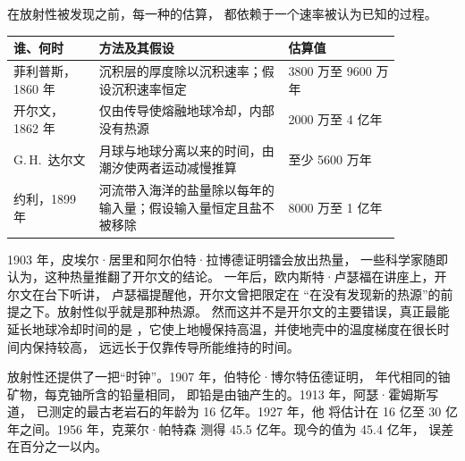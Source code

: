 在放射性被发现之前，每一种的估算，
都依赖于一个速率被认为已知的过程。

\begin{center}
\small
\begin{tabular}{|p{0.19\linewidth}|p{0.42\linewidth}|p{0.25\linewidth}|}
\hline
谁、何时 & 方法及其假设 & 估算值 \\
\hline
菲利普斯，1860 年 & 沉积层的厚度除以沉积速率；假设沉积速率恒定 & 3800 万至 9600 万年 \\
开尔文，1862 年 & 仅由传导使熔融地球冷却，内部没有热源 & 2000 万至 4 亿年 \\
G.\,H.~达尔文 & 月球与地球分离以来的时间，由潮汐使两者运动减慢推算 & 至少 5600 万年 \\
约利，1899 年 & 河流带入海洋的盐量除以每年的输入量；假设输入量恒定且盐不被移除 & 8000 万至 1 亿年 \\
\hline
\end{tabular}
\end{center}

\begin{history}[开尔文缺失的热量]
1903 年，皮埃尔·居里和阿尔伯特·拉博德证明镭会放出热量，
一些科学家随即认为，这种热量推翻了开尔文的结论。
一年后，欧内斯特·卢瑟福在讲座上，开尔文在台下听讲，
卢瑟福提醒他，开尔文曾把限定在
“在没有发现新的热源”的前提之下。放射性似乎就是那种热源。
然而这并不是开尔文的主要错误，真正最能延长地球冷却时间的是
，它使上地幔保持高温，并使地壳中的温度梯度在很长时间内保持较高，
远远长于仅靠传导所能维持的时间。
\end{history}

放射性还提供了一把“时钟”。1907 年，伯特伦·博尔特伍德证明，
年代相同的铀矿物，每克铀所含的铅量相同，
即铅是由铀产生的。1913 年，阿瑟·霍姆斯写道，
已测定的最古老岩石的年龄为 16 亿年。1927 年，他
将估计在 16 亿至 30 亿年之间。1956 年，克莱尔·帕特森
测得 45.5 亿年。现今的值为 45.4 亿年，
误差在百分之一以内。

